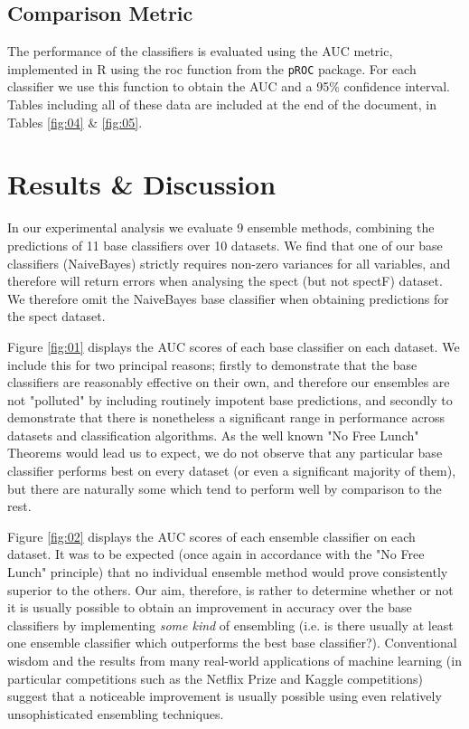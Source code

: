 \documentclass{bmcart}
\begin{document}
\subsection*{Comparison Metric}

The performance of the classifiers is evaluated using the AUC metric, implemented in R using the roc function from the \texttt{pROC} package. For each classifier we use this function to obtain the AUC and a 95\% confidence interval. Tables including all of these data are included at the end of the document, in Tables \ref{fig:04} \& \ref{fig:05}.








\section*{Results \& Discussion}
\label{results&discussion}

In our experimental analysis we evaluate 9 ensemble methods, combining the predictions of 11 base classifiers over 10 datasets. We find that one of our base classifiers (NaiveBayes) strictly requires non-zero variances for all variables, and therefore will return errors when analysing the spect (but not spectF) dataset. We therefore omit the NaiveBayes base classifier when obtaining predictions for the spect dataset.

\noindent
Figure \ref{fig:01} displays the  AUC scores of each base classifier on each dataset. We include this for two principal reasons; firstly to demonstrate that the base classifiers are reasonably effective on their own, and therefore our ensembles are not "polluted" by including routinely impotent base predictions, and secondly to demonstrate that there is nonetheless a significant range in performance across datasets and classification algorithms. As the well known "No Free Lunch" Theorems\cite{NoFreeLunch} would lead us to expect, we do not observe that any particular base classifier performs best on every dataset (or even a significant majority of them), but there are naturally some which tend to perform well by comparison to the rest.

\noindent
Figure \ref{fig:02} displays the  AUC scores of each ensemble classifier on each dataset. It was to be expected (once again in accordance with the "No Free Lunch" principle) that no individual ensemble method would prove consistently superior to the others. Our aim, therefore, is rather to determine whether or not it is usually possible to obtain an improvement in accuracy over the base classifiers by implementing \emph{some kind} of ensembling (i.e. is there usually at least one ensemble classifier which outperforms the best base classifier?). Conventional wisdom and the results from many real-world applications of machine learning (in particular competitions such as the Netflix Prize\cite{netflixprize} and Kaggle competitions\cite{kagglecompetitions}) suggest that a noticeable improvement is usually possible using even relatively unsophisticated ensembling techniques.
\end{document}
